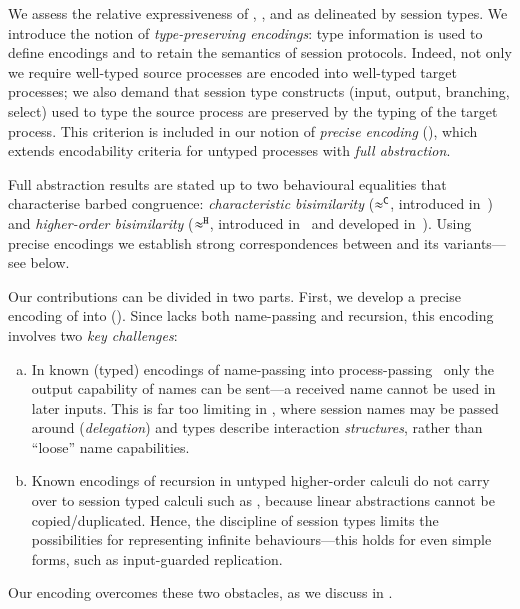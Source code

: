\documentclass[preprint,11pt]{elsarticle}
\begin{document}
We assess the relative expressiveness  of \HOp, \HO, and \sessp as delineated by session types. 
We introduce the notion of \emph{type-preserving encodings}:
type information is used to define encodings
and to retain the semantics of session protocols. 
Indeed,  not only we require 
well-typed source processes are encoded into 
well-typed target processes; 
we also demand that session type constructs (input, output, branching, select) used to type the source process
are preserved by the typing of the target process.
This criterion is included in 
our notion of \emph{precise encoding} (), which 
extends encodability criteria for untyped processes with 
\emph{full abstraction}.
{Full abstraction results are stated
up to two
behavioural equalities that characterise barbed congruence:
\emph{characteristic bisimilarity} ($\approx^\mathtt{C}$, introduced in~\cite{characteristic_bis})
and 
\emph{higher-order bisimilarity} ($\approx^\mathtt{H}$, introduced in~\cite{DBLP:conf/esop/KouzapasPY16} and  developed in~\cite{KouzapasPY17}).
Using precise encodings we establish strong correspondences between 
\HOp and its variants---see 
below.


Our contributions can be divided in two parts. 
First, we develop 
a precise encoding of \HOp into \HO ().  
Since \HO lacks 
both name-passing and recursion, this encoding involves two \emph{key challenges}:
\begin{enumerate}[a.]
\item In known (typed) 
encodings of name-passing into process-passing~\cite{SaWabook} %
only the output capability of names can be sent---a received name cannot be used in later inputs.
This is far too limiting in \HOp, where 
 session names %
 may be passed around (\emph{delegation})
and types describe interaction  \emph{structures}, rather than ``loose'' name capabilities. %



\item %
Known encodings of recursion in untyped higher-order calculi
do not carry over to session typed calculi such as \HOp,
because linear abstractions cannot be copied/duplicated. Hence, the discipline of session types  limits 
the possibilities for representing infinite behaviours---this holds for even simple forms, such as input-guarded replication.
\end{enumerate}
\noindent Our encoding overcomes these two obstacles, as we discuss in .


}
\end{document}
